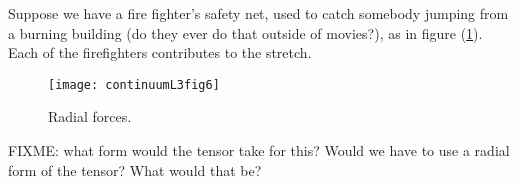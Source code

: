 Suppose we have a fire fighter's safety net, used to catch somebody jumping from a burning building (do they ever do that outside of movies?), as in figure (\ref{fig:continuumL3:continuumL3fig6}).  Each of the firefighters contributes to the stretch.  

\begin{figure}[htp]
   \centering
   \texttt{[image: continuumL3fig6]}
   \caption{Radial forces.}\label{fig:continuumL3:continuumL3fig6}
\end{figure}

FIXME: what form would the tensor take for this?  Would we have to use a radial form of the tensor?  What would that be?

\EndArticle
